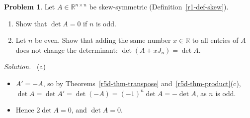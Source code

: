 \documentclass[12pt]{article}
\newcommand{\R}{\mathbb R}
\theoremstyle{definition}
\newtheorem{problem}{Problem}
\newenvironment{solution}{\par\noindent\textit{Solution.}\ }{\par\smallskip}
\begin{document}
\begin{problem}\label{r5d-ex-pr-skew-det}
Let \(A\in\R^{n\times n}\) be skew-symmetric (Definition~\ref{r1-def-skew}).
\begin{enumerate}
\item Show that \(\det A=0\) if \(n\) is odd.
\item Let \(n\) be even. Show that adding the same number \(x\in\R\) to all entries of \(A\) does not change the
determinant: \(\det(A+xJ_n)=\det A\).
\end{enumerate}
\end{problem}
\begin{solution}
(a)
\begin{itemize}
\item \(A'=-A\), so by Theorems~\ref{r5d-thm-transpose} and~\ref{r5d-thm-product}(c),
\(\det A=\det A'=\det(-A)=(-1)^n\det A=-\det A\), as \(n\) is odd.
\item Hence \(2\det A=0\), and \(\det A=0\).
\end{itemize}


\end{solution}
\end{document}

